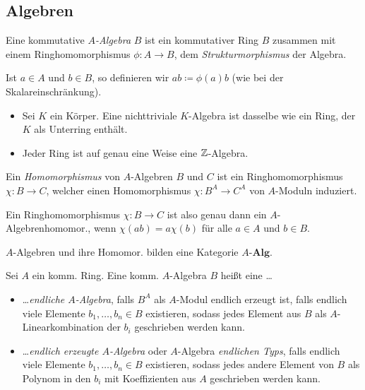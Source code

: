 \documentclass{cheat-sheet}
\newcommand{\Alg}{\mathbf{Alg}} %
\newcommand{\AAlg}[1]{{#1}\text{-}\Alg} %
\begin{document}
\subsection{Algebren}


\begin{defn}
  Eine kommutative \emph{$A$-Algebra} $B$ ist ein kommutativer Ring $B$ zusammen mit einem Ringhomomorphismus $\phi : A \to B$, dem \textit{Strukturmorphismus} der Algebra.
\end{defn}

\begin{bem}
  Ist $a \in A$ und $b \in B$, so definieren wir $a b \coloneqq \phi(a) b$ (wie bei der Skalareinschränkung).
\end{bem}

\begin{bspe}
  \begin{itemize}
    \item Sei $K$ ein Körper.
    Eine nichttriviale $K$-Algebra ist dasselbe wie ein Ring, der $K$ als Unterring enthält.
    \item Jeder Ring ist auf genau eine Weise eine $\mathbb{Z}$-Algebra.
  \end{itemize}
\end{bspe}

\begin{defn}
  Ein \textit{Homomorphismus} von $A$-Algebren $B$ und $C$ ist ein Ringhomomorphismus $\chi : B \to C$, welcher einen Homomorphismus $\chi : B^A \to C^A$ von $A$-Moduln induziert.
\end{defn}

\begin{bem}
  Ein Ringhomomorphismus $\chi : B \to C$ ist also genau dann ein $A$-Algebrenhomomor., wenn $\chi(ab) = a \chi(b)$ für alle $a \in A$ und $b \in B$.
\end{bem}

\begin{bem}
  $A$-Algebren und ihre Homomor. bilden eine Kategorie $\AAlg{A}$.
\end{bem}


\begin{defn}
  Sei $A$ ein komm. Ring.
  Eine komm. $A$-Algebra $B$ heißt eine \ldots
  \begin{itemize}
    \item \ldots \emph{endliche $A$-Algebra}, falls $B^A$ als $A$-Modul endlich erzeugt ist, \dh{} falls endlich viele Elemente $b_1, \ldots, b_n \in B$ existieren, sodass jedes Element aus $B$ als $A$-Linearkombination der $b_i$ geschrieben werden kann.
    \item \ldots \emph{endlich erzeugte $A$-Algebra} oder $A$-Algebra \emph{endlichen Typs}, falls endlich viele Elemente $b_1, \ldots, b_n \in B$ existieren, sodass jedes andere Element von $B$ als Polynom in den $b_i$ mit Koeffizienten aus $A$ geschrieben werden kann.
  \end{itemize}
\end{defn}
\end{document}
